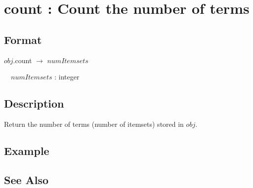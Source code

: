
\section{count : Count the number of terms\label{sect:count}}
\subsection*{Format}
$obj$.count $\rightarrow$ $numItemsets$

~~$numItemsets$ : integer

\subsection*{Description}
Return the number of terms (number of itemsets) stored in $obj$. 

\subsection*{Example}


\subsection*{See Also}

